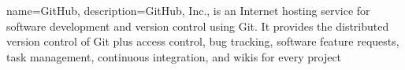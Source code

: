 {
    name=GitHub,
    description={GitHub, Inc., is an Internet hosting service for software development and version control using Git. It provides the distributed version control of Git plus access control, bug tracking, software feature requests, task management, continuous integration, and wikis for every project}
}
